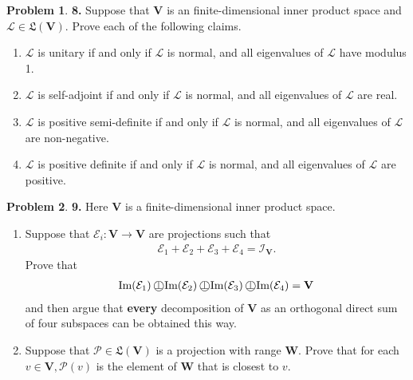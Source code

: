 \documentclass{article}
\theoremstyle{definition}
\newtheorem*{prob*}{Problem}
\newcommand{\V}{\mathbf{V}}
\newcommand{\W}{\mathbf{W}}
\newcommand*{\operp}{\perp\mkern-20.7mu\bigcirc}
\newcommand{\lag}{\mathcal{L}}
\newcommand{\E}{\mathcal{E}}
\newcommand{\ima}{\text{Im}}
\newcommand{\LL}{\mathfrak{L}}
\newcommand{\id}{\mathcal{I}}
\begin{document}
\begin{prob*}\textbf{8.} Suppose that $\V$ is an finite-dimensional inner product space and $\lag \in \LL(\V)$. Prove each of the following claims.
	\begin{enumerate}
		\item $\lag$ is unitary if and only if $\lag$ is normal, and all eigenvalues of $\lag$ have modulus 1.
		\item $\lag$ is self-adjoint if and only if $\lag$ is normal, and all eigenvalues of $\lag$ are real.
		\item $\lag$ is positive semi-definite if and only if $\lag$ is normal, and all eigenvalues of $\lag$ are non-negative. 
		\item $\lag$ is positive definite if and only if $\lag$ is normal, and all eigenvalues of $\lag$ are positive. 
	\end{enumerate}
	
\end{prob*}




\newpage



\begin{prob*}\textbf{9.} Here $\V$ is a finite-dimensional inner product space. 
	\begin{enumerate}
		\item Suppose that $\E_i : \V \to \V$ are projections such that 
		\begin{align*}
		\E_1 + \E_2 + \E_3 + \E_4 = \id_\V.
		\end{align*}
		Prove that 
		\begin{align*}
		\ima(\E_1) \operp \ima(\E_2) \operp \ima(\E_3) \operp \ima(\E_4) = \V
		\end{align*}
		and then argue that \textbf{every} decomposition of $\V$ as an orthogonal direct sum of four subspaces can be obtained this way.
		
		
		
		\item Suppose that $\mathcal{P} \in \LL(\V)$ is a projection with range $\W$. Prove that for each $v \in \V, \mathcal{P}(v)$ is the element of $\W$ that is closest to $v$. 
	\end{enumerate}



	
\end{prob*}



\newpage
\end{document}
